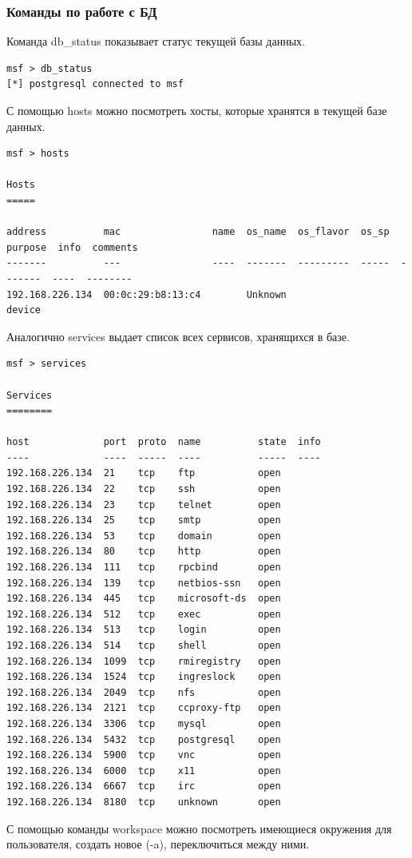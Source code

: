 \documentclass[10pt,a4paper,titlepage]{article}
\begin{document}
\subsubsection{Команды по работе с БД}
Команда db\_status показывает статус текущей базы данных.
\begin{verbatim}
msf > db_status
[*] postgresql connected to msf
\end{verbatim}
С помощью hosts можно посмотреть хосты, которые хранятся в текущей базе данных.
\begin{verbatim}
msf > hosts

Hosts
=====

address          mac                name  os_name  os_flavor  os_sp  purpose  info  comments
-------          ---                ----  -------  ---------  -----  -------  ----  --------
192.168.226.134  00:0c:29:b8:13:c4        Unknown                    device         
\end{verbatim}
Аналогично services выдает список всех сервисов, хранящихся в базе.
\begin{verbatim}
msf > services

Services
========

host             port  proto  name          state  info
----             ----  -----  ----          -----  ----
192.168.226.134  21    tcp    ftp           open   
192.168.226.134  22    tcp    ssh           open   
192.168.226.134  23    tcp    telnet        open   
192.168.226.134  25    tcp    smtp          open   
192.168.226.134  53    tcp    domain        open   
192.168.226.134  80    tcp    http          open   
192.168.226.134  111   tcp    rpcbind       open   
192.168.226.134  139   tcp    netbios-ssn   open   
192.168.226.134  445   tcp    microsoft-ds  open   
192.168.226.134  512   tcp    exec          open   
192.168.226.134  513   tcp    login         open   
192.168.226.134  514   tcp    shell         open   
192.168.226.134  1099  tcp    rmiregistry   open   
192.168.226.134  1524  tcp    ingreslock    open   
192.168.226.134  2049  tcp    nfs           open   
192.168.226.134  2121  tcp    ccproxy-ftp   open   
192.168.226.134  3306  tcp    mysql         open   
192.168.226.134  5432  tcp    postgresql    open   
192.168.226.134  5900  tcp    vnc           open   
192.168.226.134  6000  tcp    x11           open   
192.168.226.134  6667  tcp    irc           open   
192.168.226.134  8180  tcp    unknown       open   
\end{verbatim}
С помощью команды workspace можно посмотреть имеющиеся окружения для пользователя, создать новое (-a), переключиться между ними.
\end{document}
